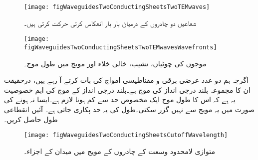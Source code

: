 \begin{figure}
\centering
\texttt{[image: figWaveguidesTwoConductingSheetsTwoTEMwaves]}
\caption{شعاعیں دو چادروں کے درمیان بار بار انعکاس کرتی حرکت کرتی ہیں۔}
\label{شکل_مویج_شعاع_انعکاس_کرتی_حرکت_کرتی_ہے}
\end{figure}
%
\begin{figure}
\centering
\texttt{[image: figWaveguidesTwoConductingSheetsTwoTEMwavesWavefronts]}
\caption{موجوں کی چوٹیاں، نشیب، خالی خلاء اور مویج میں طول موج۔}
\label{شکل_مویج_خالی_خلاء_اور_مویج_طول-موج}
\end{figure}

اگرچہ ہم دو عدد عرضی برقی و مقناطیسی  امواج کی بات کرتے آ رہے ہیں، درحقیقت ان کا مجموعہ بلند درجی  انداز کی موج ہے۔بلند درجی انداز کے موج کی اہم خصوصیت  یہ ہے کہ اس کا طول موج ایک مخصوص حد سے کم ہونا لازم ہے۔ایسا نہ ہونے کی صورت میں یہ مویج سے نہیں گزر سکتی۔طول کی یہ حد  پکاری جاتی ہے۔ آئیں انقطاعی طول حاصل کریں۔

 \begin{figure}
\centering
\texttt{[image: figWaveguidesTwoConductingSheetsCutoffWavelength]}
\caption{متوازی لامحدود وسعت کے چادروں کے مویج میں میدان کے اجزاء۔}
\label{شکل_مویج_متوازی_چادر_مویج_اجزاء_میدان}
\end{figure}

